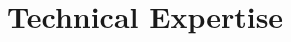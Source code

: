 \section*{Technical Expertise}
\begin{tcolorbox}[mybox]
\begin{itemize}
\end{itemize}
\end{tcolorbox}
